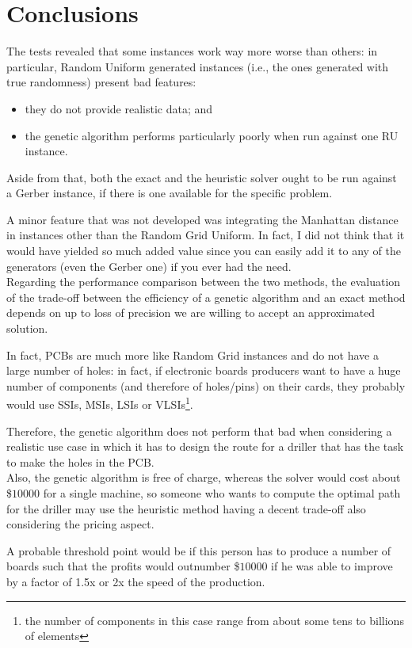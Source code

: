 \section{Conclusions}\label{sec:conclusions}

The tests revealed that some instances work way more worse than others: in
particular, Random Uniform generated instances (i.e., the ones generated with
true randomness) present bad features:

\begin{itemize}
  \item they do not provide realistic data; and
  \item the genetic algorithm performs particularly poorly when run against one
    RU instance.
\end{itemize}

Aside from that, both the exact and the heuristic solver ought to be run against
a Gerber instance, if there is one available for the specific problem.

A minor feature that was not developed was integrating the Manhattan distance in
instances other than the Random Grid Uniform. In fact, I did not think that it
would have yielded so much added value since you can easily add it to any of the
generators (even the Gerber one) if you ever had the need. \\

Regarding the performance comparison between the two methods, the evaluation of
the trade-off between the efficiency of a genetic algorithm and an exact method
depends on up to loss of precision we are willing to accept an approximated
solution.

In fact, PCBs are much more like Random Grid instances and do not have a large
number of holes: in fact, if electronic boards producers want to have a huge
number of components (and therefore of holes/pins) on their cards, they probably
would use SSIs, MSIs, LSIs or VLSIs\footnote{the number of components in this
case range from about some tens to billions of elements}.

Therefore, the genetic algorithm does not perform that bad when considering a
realistic use case in which it has to design the route for a driller that has
the task to make the holes in the PCB. \\

Also, the genetic algorithm is free of charge, whereas the \cplex{} solver would
cost about \$$10000$ for a single machine, so someone who wants to compute the
optimal path for the driller may use the heuristic method having a decent
trade-off also considering the pricing aspect.

A probable threshold point would be if this person has to produce a number of
boards such that the profits would outnumber \$$10000$ if he was able to
improve by a factor of 1.5x or 2x the speed of the production.

